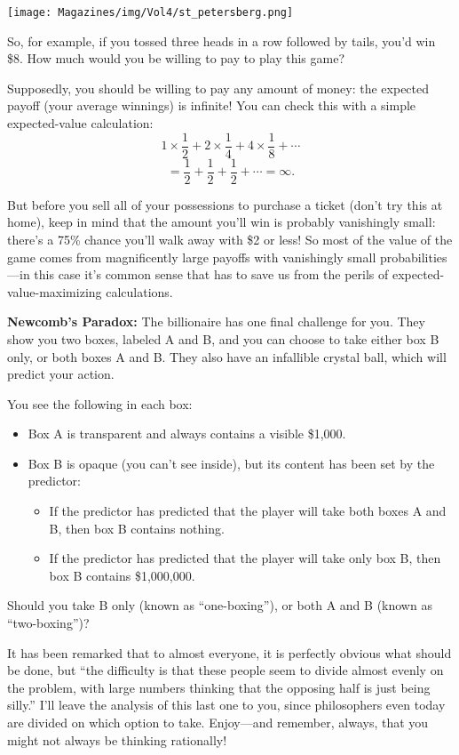 \documentclass{article}
\begin{document}
\begin{multicols}{3}
\begin{center}
    \texttt{[image: Magazines/img/Vol4/st\_petersberg.png]}
\end{center}

So, for example, if you tossed three heads in a row followed by tails, you'd win \$8.
How much would you be willing to pay to play this game?

Supposedly, you should be willing to pay any amount of money: the expected payoff (your average winnings) is infinite! You can check this with a simple expected-value calculation:
\[1\times\frac12 + 2\times\frac14 + 4\times\frac18 + \cdots \]
\[= \frac12 + \frac12 + \frac12 + \cdots = \infty.\]

But before you sell all of your possessions to purchase a ticket (don't try this at home), keep in mind that the amount you'll win is probably vanishingly small: there's a 75\% chance you'll walk away with \$2 or less! So most of the value of the game comes from magnificently large payoffs with vanishingly small probabilities---in this case it's common sense that has to save us from the perils of expected-value-maximizing calculations.

\textbf{Newcomb’s Paradox:} The billionaire has one final challenge for you. They show you two boxes, labeled A and B, and you can choose to take either box B only, or both boxes A and B.
They also have an infallible crystal ball, which will predict your action.

You see the following in each box:
\begin{itemize}
    \item Box A is transparent and always contains a visible \$1,000.
    \item Box B is opaque (you can't see inside), but its content has been set by the predictor:
    \begin{itemize}
    \item If the predictor has predicted that the player will take both boxes A and B, then box B contains nothing.
    \item If the predictor has predicted that the player will take only box B, then box B contains \$1,000,000.
    \end{itemize}
\end{itemize}
Should you take B only (known as ``one-boxing''), or both A and B (known as ``two-boxing'')?

It has been remarked that to almost everyone, it is perfectly obvious what should be done, but ``the difficulty is that these people seem to divide almost evenly on the problem, with large numbers thinking that the opposing half is just being silly.''
I'll leave the analysis of this last one to you, since philosophers even today are divided on which option to take. Enjoy---and remember, always, that you might not always be thinking rationally!
\closearticle


\end{multicols}
\end{document}
